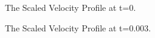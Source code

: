 \documentclass{article}
\begin{document}
  \begin{figure}[H]
    \centering
    \noindent{}
    \caption{The Scaled Velocity Profile at t=0.} \label{fig:00}
  \end{figure}
  
  \begin{figure}[H]
    \centering
    \noindent{}
    \caption{The Scaled Velocity Profile at t=0.003.} \label{fig:11}
  \end{figure}
  
\end{document}
